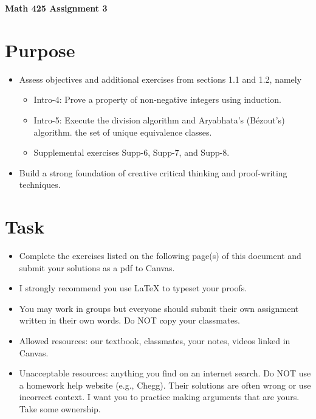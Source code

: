 \documentclass[12pt]{article}
\begin{document}
	\begin{center}
		{\Large \bf Math 425 Assignment 3}
	\end{center}
	\section*{Purpose}
		\begin{itemize}
			\item Assess objectives and additional exercises from sections 1.1 and 1.2, namely
				\begin{itemize}
					\item Intro-4: Prove a property of non-negative integers using induction.
					\item Intro-5: Execute the division algorithm and Aryabhata’s (Bézout’s) algorithm. the set of unique equivalence classes.
					\item Supplemental exercises Supp-6, Supp-7, and Supp-8. 
				\end{itemize}
			\item Build a strong foundation of creative critical thinking and proof-writing techniques.
		\end{itemize}
	\section*{Task}
		\begin{itemize}
			\item Complete the exercises listed on the following page(s) of this document and submit your solutions as a pdf to Canvas.
			\item I strongly recommend you use LaTeX to typeset your proofs.
			\item You may work in groups but everyone should submit their own assignment written in their own words.  Do NOT copy your classmates.
			\item Allowed resources: our textbook, classmates, your notes, videos linked in Canvas.
			\item Unacceptable resources: anything you find on an internet search. Do NOT use a homework help website (e.g., Chegg). Their solutions are often wrong or use incorrect context.  I want you to practice making arguments that are yours. Take some ownership.
		\end{itemize}
\end{document}
